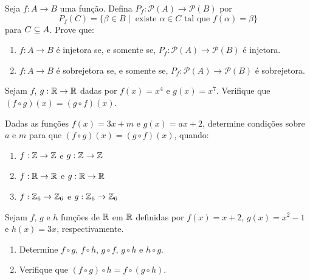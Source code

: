\documentclass[12pt]{exam}
\begin{document}
    \vspace{.3cm}

    \questao{} Seja $f : A \to B$ uma função. Defina $P_f : \mathcal{P}(A) \to \mathcal{P}(B)$ por
    \[
        P_f(C) = \{\beta \in B \mid \mbox{ existe } \alpha \in C \mbox{ tal que } f(\alpha) = \beta\}
    \]
    para $C \subseteq A$. Prove que:
    \begin{enumerate}[label={\roman*})]

        \item $f : A \to B$ é injetora se, e somente se, $P_f : \mathcal{P}(A) \to \mathcal{P}(B)$ é injetora.

        \item $f : A \to B$ é sobrejetora se, e somente se, $P_f : \mathcal{P}(A) \to \mathcal{P}(B)$ é sobrejetora.
    \end{enumerate}


    \vspace{.3cm}

    \questao{} Sejam $f$, $g : \mathbb{R} \to \mathbb{R}$ dadas por $f(x) = x^4$ e $g(x) = x^7$. Verifique que $(f\circ g)(x) = (g\circ f)(x)$.

    \vspace{.3cm}

    \questao{} Dadas as funções $f(x) = 3x + m$ e $g(x) = ax + 2$, determine condições sobre $a$ e $m$ para que $(f\circ g)(x) = (g\circ f)(x)$, quando:
    \begin{enumerate}[label={\roman*})]
        \item $f : \mathbb{Z} \to \mathbb{Z}$ e $g : \mathbb{Z} \to \mathbb{Z}$
        \item $f : \mathbb{R} \to \mathbb{R}$ e $g : \mathbb{R} \to \mathbb{R}$
        \item $f : \mathbb{Z}_6 \to \mathbb{Z}_6$ e $g : \mathbb{Z}_6 \to \mathbb{Z}_6$
    \end{enumerate}

    \vspace{.3cm}

    \questao{} Sejam $f$, $g$ e $h$ funções de $\mathbb{R}$ em $\mathbb{R}$ definidas por $f(x) = x + 2$, $g(x) = x^2 - 1$ e $h(x) = 3x$, respectivamente.
    \begin{enumerate}[label={\alph*})]
        \item Determine $f \circ g$, $f \circ h$, $g \circ f$, $g \circ h$ e $h \circ g$.
        \item Verifique que $(f \circ g)\circ h = f \circ (g \circ h)$.
    \end{enumerate}

    \vspace{.3cm}
\end{document}
